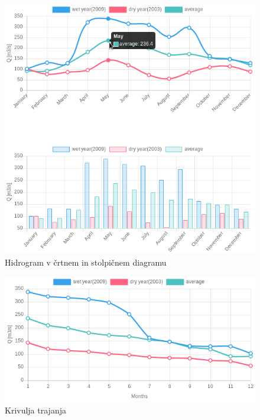 \begin{figure}[htp!]
	\begin{centering}
		\includegraphics[width=\textwidth]{slike/opis/hidrogram.png}		
		\caption{Hidrogram v črtnem in stolpičnem diagramu}\label{fig:opis_hidrogram}
	\end{centering}
\end{figure}


\begin{figure}[htp!]
	\begin{centering}
		\includegraphics[width=\textwidth]{slike/opis/krivuljaTrajanja.png}		
		\caption{Krivulja trajanja}\label{fig:opis_krivuljaTrajanja}
	\end{centering}
\end{figure}




